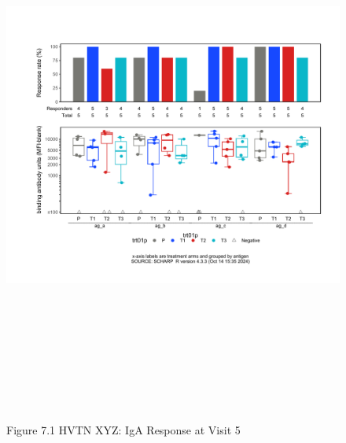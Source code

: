 \documentclass[12pt]{article}
\begin{document}
\begin{figure}[H]

{\centering \includegraphics[width=8.75in,height=7.25in]{test_cases_files/figure-latex/unnamed-chunk-14-1} 

}

\caption[Figure 7.1 boxplot (pos. response boxplots)]{Figure 7.1 HVTN XYZ: IgA Response at Visit 5}\label{fig:unnamed-chunk-14}
\end{figure}
\clearpage
\end{document}
